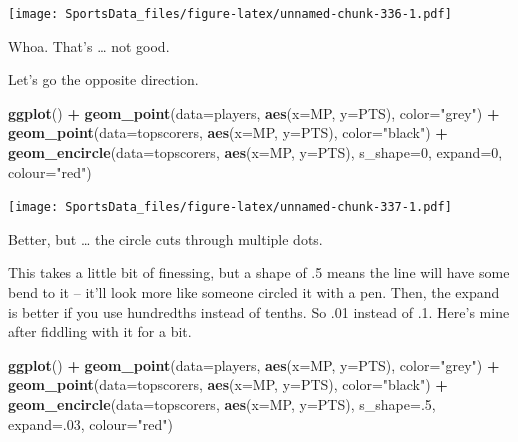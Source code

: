 \documentclass[]{book}
\newenvironment{Shaded}{\begin{snugshade}}{\end{snugshade}}
\newcommand{\DataTypeTok}[1]{\textcolor[rgb]{0.13,0.29,0.53}{#1}}
\newcommand{\DecValTok}[1]{\textcolor[rgb]{0.00,0.00,0.81}{#1}}
\newcommand{\KeywordTok}[1]{\textcolor[rgb]{0.13,0.29,0.53}{\textbf{#1}}}
\newcommand{\NormalTok}[1]{#1}
\newcommand{\OperatorTok}[1]{\textcolor[rgb]{0.81,0.36,0.00}{\textbf{#1}}}
\newcommand{\StringTok}[1]{\textcolor[rgb]{0.31,0.60,0.02}{#1}}
\begin{document}
\texttt{[image: SportsData\_files/figure-latex/unnamed-chunk-336-1.pdf]}

Whoa. That's \ldots{} not good.

Let's go the opposite direction.

\begin{Shaded}
\begin{Highlighting}[]
\KeywordTok{ggplot}\NormalTok{() }\OperatorTok{+}\StringTok{ }
\StringTok{  }\KeywordTok{geom_point}\NormalTok{(}\DataTypeTok{data=}\NormalTok{players, }\KeywordTok{aes}\NormalTok{(}\DataTypeTok{x=}\NormalTok{MP, }\DataTypeTok{y=}\NormalTok{PTS), }\DataTypeTok{color=}\StringTok{"grey"}\NormalTok{) }\OperatorTok{+}\StringTok{ }
\StringTok{  }\KeywordTok{geom_point}\NormalTok{(}\DataTypeTok{data=}\NormalTok{topscorers, }\KeywordTok{aes}\NormalTok{(}\DataTypeTok{x=}\NormalTok{MP, }\DataTypeTok{y=}\NormalTok{PTS), }\DataTypeTok{color=}\StringTok{"black"}\NormalTok{) }\OperatorTok{+}\StringTok{ }
\StringTok{  }\KeywordTok{geom_encircle}\NormalTok{(}\DataTypeTok{data=}\NormalTok{topscorers, }\KeywordTok{aes}\NormalTok{(}\DataTypeTok{x=}\NormalTok{MP, }\DataTypeTok{y=}\NormalTok{PTS), }\DataTypeTok{s_shape=}\DecValTok{0}\NormalTok{, }\DataTypeTok{expand=}\DecValTok{0}\NormalTok{, }\DataTypeTok{colour=}\StringTok{"red"}\NormalTok{)}
\end{Highlighting}
\end{Shaded}

\texttt{[image: SportsData\_files/figure-latex/unnamed-chunk-337-1.pdf]}

Better, but \ldots{} the circle cuts through multiple dots.

This takes a little bit of finessing, but a shape of .5 means the line will have some bend to it -- it'll look more like someone circled it with a pen. Then, the expand is better if you use hundredths instead of tenths. So .01 instead of .1. Here's mine after fiddling with it for a bit.

\begin{Shaded}
\begin{Highlighting}[]
\KeywordTok{ggplot}\NormalTok{() }\OperatorTok{+}\StringTok{ }
\StringTok{  }\KeywordTok{geom_point}\NormalTok{(}\DataTypeTok{data=}\NormalTok{players, }\KeywordTok{aes}\NormalTok{(}\DataTypeTok{x=}\NormalTok{MP, }\DataTypeTok{y=}\NormalTok{PTS), }\DataTypeTok{color=}\StringTok{"grey"}\NormalTok{) }\OperatorTok{+}\StringTok{ }
\StringTok{  }\KeywordTok{geom_point}\NormalTok{(}\DataTypeTok{data=}\NormalTok{topscorers, }\KeywordTok{aes}\NormalTok{(}\DataTypeTok{x=}\NormalTok{MP, }\DataTypeTok{y=}\NormalTok{PTS), }\DataTypeTok{color=}\StringTok{"black"}\NormalTok{) }\OperatorTok{+}\StringTok{ }
\StringTok{  }\KeywordTok{geom_encircle}\NormalTok{(}\DataTypeTok{data=}\NormalTok{topscorers, }\KeywordTok{aes}\NormalTok{(}\DataTypeTok{x=}\NormalTok{MP, }\DataTypeTok{y=}\NormalTok{PTS), }\DataTypeTok{s_shape=}\NormalTok{.}\DecValTok{5}\NormalTok{, }\DataTypeTok{expand=}\NormalTok{.}\DecValTok{03}\NormalTok{, }\DataTypeTok{colour=}\StringTok{"red"}\NormalTok{)}
\end{Highlighting}
\end{Shaded}
\end{document}
